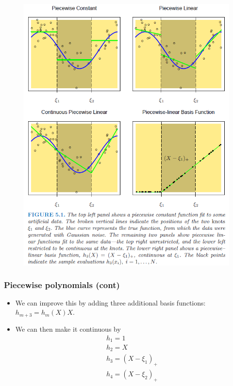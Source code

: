 \begin{frame}
  \begin{figure}[htbp]
  \begin{center}
  \includegraphics[height=\textheight]{./resources/ESLPiecewise}
  \end{center}
  \end{figure}
\end{frame}

\begin{frame}
  \frametitle{Piecewise polynomials (cont)}
  \begin{itemize}
     \item We can improve this by adding three additional basis functions: $h_{m+3} = h_m(X)X$. 
    \item We can then make it continuous by 
    \begin{eqnarray*}
      h_1 = 1 \\
      h_2 = X \\
      h_3 = (X- \xi_1)_+ \\
      h_4 = (X - \xi_2)_+ 
    \end{eqnarray*} 
  \end{itemize}
\end{frame}


